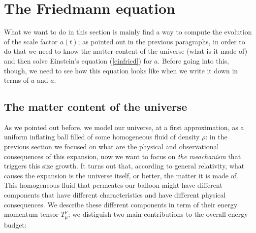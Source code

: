 \section{The Friedmann equation}
What we want to do in this section is mainly find a way to compute the evolution of the scale factor $a(t)$; as pointed out in the previous paragraphs, in order to do that we need to know the matter content of the universe (what is it made of) and then solve Einstein's equation (\ref{einfried}) for $a$. Before going into this, though, we need to see how this equation looks like when we write it down in terms of $a$ and $\dot{a}$.
\subsection{The matter content of the universe}
As we pointed out before, we model our universe, at a first approximation, as a uniform inflating ball filled of some homogeneous fluid of density $\rho$: in the previous section we focused on what are the physical and observational consequences of this expansion, now we want to focus on \textit{the meachanism} that triggers this size growth. It turns out that, according to general relativity, what causes the expansion is the universe itself, or better, the matter it is made of. This homogeneous fluid that permeates our balloon might have different components that have different characteristics and have different physical consequences. We describe these different components in term of their energy momentum tensor $T_{\mu}^{\nu}$; we distiguish two main contributions to the overall energy budget:
